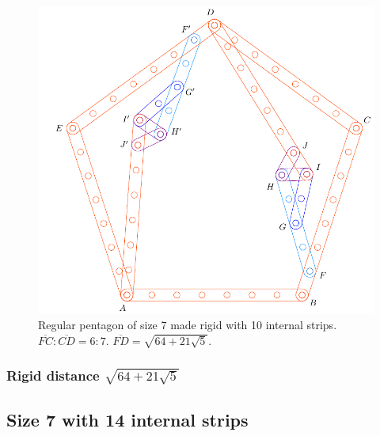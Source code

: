 \documentclass[11pt]{article}
\begin{document}
\begin{figure}[H]
\centering
\includegraphics[scale=0.7]{7/penta7-10a}
\caption{Regular pentagon of size 7 made rigid with 10 internal strips. $\overline{FC} : \overline{CD} = 6:7$. $\overline{FD} = \sqrt{64 + 21\sqrt5}$.}
\label{fig:penta7-10a}
\end{figure}

\subsubsection{Rigid distance $\sqrt{64 + 21\sqrt5}$}

\subsection{Size 7 with 14 internal strips}
\end{document}
